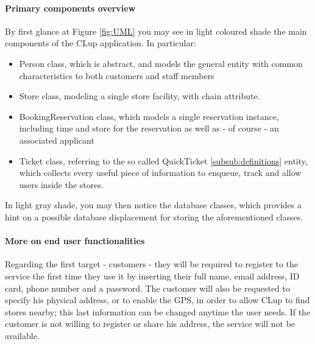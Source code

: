 \paragraph{Primary components overview}
By first glance at Figure \ref{fig:UML} you may see in light coloured shade the main components of the CLup application. In particular:\newline
\begin{itemize}
    \item Person class, which is abstract, and models the general entity with common characteristics to both customers and staff members
    \item Store class, modeling a single store facility, with chain attribute.
    \item BookingReservation class, which models a single reservation instance, including time and store for the reservation as well as - of course - an associated applicant
    \item Ticket class, referring to the so called QuickTicket \ref{subsub:definitions} entity, which collects every useful piece of information to enqueue, track and allow users inside the stores.
\end{itemize}
In light gray shade, you may then notice the database classes,  which provides a hint on a possible database displacement for storing the aforementioned classes.


\paragraph{More on end user functionalities}
Regarding the first target - customers - they will be required to register to the service the first time they use it by inserting their full name, email address, ID card, phone number and a password. The customer will also be requested to specify his physical address, or to enable the GPS, in order to allow CLup to find stores nearby; this last information can be changed anytime the user needs. If the customer is not willing to register or share his address, the service will not be available.

